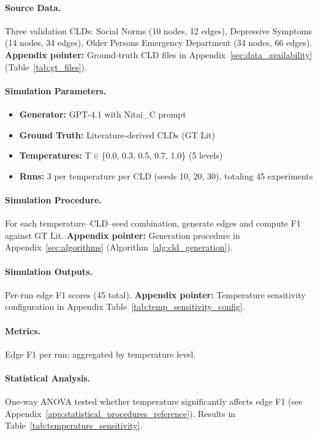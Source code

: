 \paragraph{Source Data.}
Three validation CLDs: Social Norms (10 nodes, 12 edges), Depressive Symptoms (14 nodes, 34 edges), Older Persons Emergency Department (34 nodes, 66 edges).
\textbf{Appendix pointer:} Ground-truth CLD files in Appendix~\ref{sec:data_availability} (Table~\ref{tab:gt_files}).

\paragraph{Simulation Parameters.}
\begin{itemize}[noitemsep]
    \item \textbf{Generator:} GPT-4.1 with Nitai\_C prompt
    \item \textbf{Ground Truth:} Literature-derived CLDs (GT Lit)
    \item \textbf{Temperatures:} T$\in$\{0.0, 0.3, 0.5, 0.7, 1.0\} (5 levels)
    \item \textbf{Runs:} 3 per temperature per CLD (seeds 10, 20, 30), totaling 45 experiments
\end{itemize}

\paragraph{Simulation Procedure.}
For each temperature--CLD--seed combination, generate edges and compute F1 against GT Lit.
\textbf{Appendix pointer:} Generation procedure in Appendix~\ref{sec:algorithms} (Algorithm~\ref{alg:cld_generation}).

\paragraph{Simulation Outputs.}
Per-run edge F1 scores (45 total).
\textbf{Appendix pointer:} Temperature sensitivity configuration in Appendix Table~\ref{tab:temp_sensitivity_config}.

\paragraph{Metrics.}
Edge F1 per run; aggregated by temperature level.

\paragraph{Statistical Analysis.}
One-way ANOVA tested whether temperature significantly affects edge F1 (see Appendix~\ref{app:statistical_procedures_reference}). Results in Table~\ref{tab:temperature_sensitivity}.

